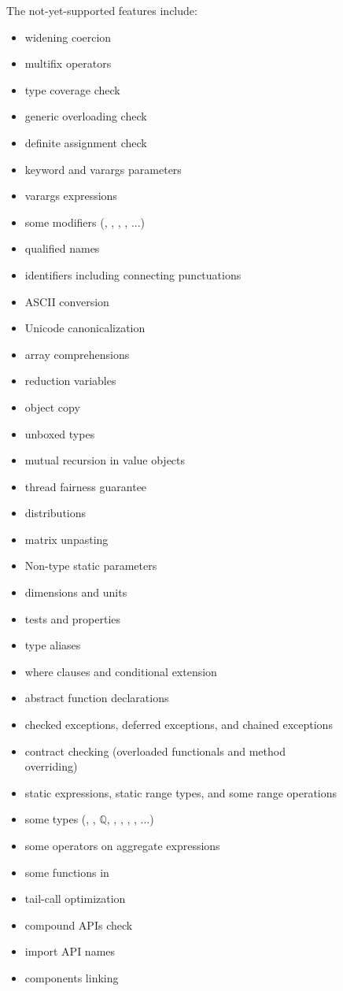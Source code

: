 \begin{figure}[p]
The not-yet-supported features include:
\begin{itemize}
\item widening coercion
\item multifix operators
\item type coverage check
\item generic overloading check
\item definite assignment check
\item keyword and varargs parameters
\item varargs expressions
\item some modifiers (, , , , ...)
\item qualified names
\item identifiers including connecting punctuations
\item ASCII conversion
\item Unicode canonicalization
\item array comprehensions
\item reduction variables
\item object copy
\item unboxed types
\item mutual recursion in value objects
\item thread fairness guarantee
\item distributions
\item matrix unpasting
\item Non-type static parameters
\item dimensions and units
\item tests and properties
\item type aliases
\item where clauses and conditional extension
\item abstract function declarations
\item checked exceptions, deferred exceptions, and chained exceptions
\item contract checking (overloaded functionals and method overriding)
\item static expressions, static range types, and some range operations
\item some types (,
, $\mathbb{Q}$,
, , , , ...)
\item some operators on aggregate expressions
\item some functions in 
\item tail-call optimization
\item compound APIs check
\item import API names
\item components linking
\end{itemize}
\end{figure}

